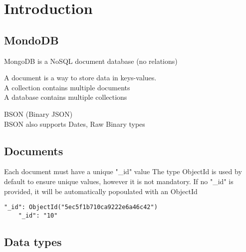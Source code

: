 \documentclass[a4paper]{article}
\author{Paolo Bettelini}
\date{}
\begin{document}
\maketitle
\tableofcontents
\pagebreak

\section{Introduction}

\subsection{MondoDB}

MongoDB is a NoSQL document database (no relations)

A document is a way to store data in keys-values.
\\
A collection contains multiple documents
\\
A database contains multiple collections

BSON (Binary JSON)
\\
BSON also supports Dates, Raw Binary types

\subsection{Documents}

Each document must have a unique "\_id" value
The type ObjectId is used by default to ensure unique values,
however it is not mandatory.
If no "\_id" is provided, it will be automatically popoulated with an ObjectId

\begin{lstlisting}[style=js]
    "_id": ObjectId("5ec5f1b710ca9222e6a46c42")
    "_id": "10"
\end{lstlisting}

\subsection{Data types}
\end{document}
